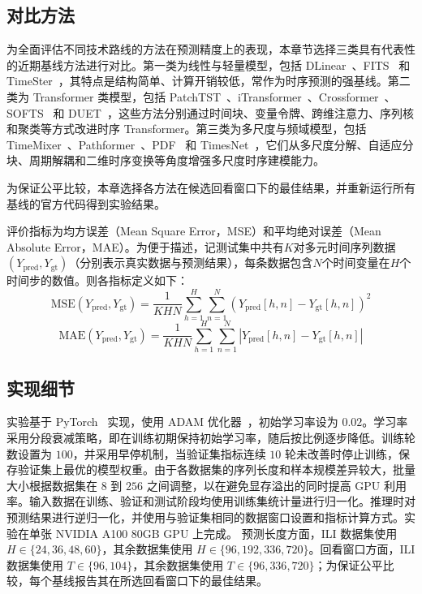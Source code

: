 \subsection{对比方法}

为全面评估不同技术路线的方法在预测精度上的表现，本章节选择三类具有代表性的近期基线方法进行对比。第一类为线性与轻量模型，包括 DLinear~\cite{dlinear}、FITS~\cite{fits} 和 TimeSter~\cite{timester}，其特点是结构简单、计算开销较低，常作为时序预测的强基线。第二类为 Transformer 类模型，包括 PatchTST~\cite{patchtst}、iTransformer~\cite{itransformer}、Crossformer~\cite{crossformer}、SOFTS~\cite{softs} 和 DUET~\cite{duet}，这些方法分别通过时间块、变量令牌、跨维注意力、序列核和聚类等方式改进时序 Transformer。第三类为多尺度与频域模型，包括 TimeMixer~\cite{timemixer}、Pathformer~\cite{pathformer}、PDF~\cite{pdf} 和 TimesNet~\cite{timesnet}，它们从多尺度分解、自适应分块、周期解耦和二维时序变换等角度增强多尺度时序建模能力。

为保证公平比较，本章选择各方法在候选回看窗口下的最佳结果，并重新运行所有基线的官方代码得到实验结果。

评价指标为均方误差（Mean Square Error，MSE）和平均绝对误差（Mean Absolute Error，MAE）。为便于描述，记测试集中共有$K$对多元时间序列数据$(Y_{\mathrm{pred}}, Y_{\mathrm{gt}})$（分别表示真实数据与预测结果），每条数据包含$N$个时间变量在$H$个时间步的数值。则各指标定义如下：
\begin{equation}
    \mathrm{MSE}(Y_{\mathrm{pred}}, Y_{\mathrm{gt}}) = \frac{1}{KHN}\sum_{h=1}^{H}\sum_{n=1}^{N}
    \left(Y_{\mathrm{pred}}[h,n] - Y_{\mathrm{gt}}[h,n]\right)^{2}
\end{equation}
\begin{equation}
    \mathrm{MAE}(Y_{\mathrm{pred}}, Y_{\mathrm{gt}}) = \frac{1}{KHN}\sum_{h=1}^{H}\sum_{n=1}^{N}
    \left|Y_{\mathrm{pred}}[h,n] - Y_{\mathrm{gt}}[h,n]\right|
\end{equation}

\subsection{实现细节}

实验基于 PyTorch~\cite{pytorch} 实现，使用 ADAM 优化器~\cite{adam}，初始学习率设为 $0.02$。学习率采用分段衰减策略，即在训练初期保持初始学习率，随后按比例逐步降低。训练轮数设置为 $100$，并采用早停机制，当验证集指标连续 $10$ 轮未改善时停止训练，保存验证集上最优的模型权重。由于各数据集的序列长度和样本规模差异较大，批量大小根据数据集在 $8$ 到 $256$ 之间调整，以在避免显存溢出的同时提高 GPU 利用率。输入数据在训练、验证和测试阶段均使用训练集统计量进行归一化。推理时对预测结果进行逆归一化，并使用与验证集相同的数据窗口设置和指标计算方式。实验在单张 NVIDIA A100 80GB GPU 上完成。
预测长度方面，ILI 数据集使用 $H\in\{24,36,48,60\}$，其余数据集使用 $H\in\{96,192,336,720\}$。回看窗口方面，ILI 数据集使用 $T\in\{96,104\}$，其余数据集使用 $T\in\{96,336,720\}$；为保证公平比较，每个基线报告其在所选回看窗口下的最佳结果。

